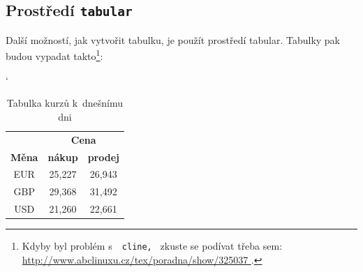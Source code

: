 \documentclass[11pt]{article}
\begin{document}
\subsection{Prostředí \texttt{tabular}}
    Další možností, jak vytvořit tabulku, je použít prostředí tabular. Tabulky pak 
budou vypadat takto\footnote{Kdyby byl problém s~\texttt{ cline, } zkuste se podívat třeba sem: \href{http://www.abclinuxu.cz/tex/poradna/show/325037}{http://www.abclinuxu.cz/tex/poradna/show/325037 }.}: \bigskip

\begin{table}[h]
\catcode`
\begin{center}
    \begin{tabular}{|c|c|c|} \hline
         &\multicolumn{2}{|c|}{\textbf{Cena}}  \\ \cline{2-3}
        \textbf{Měna} & \textbf{nákup} & \textbf{prodej}
        \\
        \hline
        EUR & 25,227 & 26,943 \\ 
        GBP & 29,368 & 31,492 \\
        USD & 21,260 & 22,661 \\ \hline
    \end{tabular}
    \caption{Tabulka kurzů k~dnešnímu dni}
    \label{tabKurzu}
\end{center}
\end{table}
\end{document}
